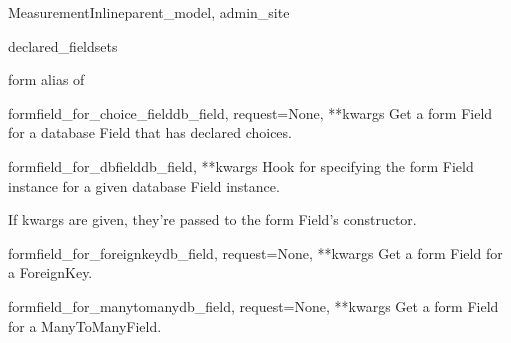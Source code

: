 \documentclass[letterpaper,10pt,english]{sphinxmanual}
\begin{document}
\hypertarget{data.admin.MeasurementInline}{}\begin{classdesc}{MeasurementInline}{parent\_model, admin\_site}~

\hypertarget{data.admin.MeasurementInline.declared_fieldsets}{}\begin{memberdesc}{declared\_fieldsets}\end{memberdesc}

\hypertarget{data.admin.MeasurementInline.form}{}\begin{memberdesc}{form}
alias of 
\end{memberdesc}

\hypertarget{data.admin.MeasurementInline.formfield_for_choice_field}{}\begin{methoddesc}{formfield\_for\_choice\_field}{db\_field, request=None, **kwargs}
Get a form Field for a database Field that has declared choices.
\end{methoddesc}

\hypertarget{data.admin.MeasurementInline.formfield_for_dbfield}{}\begin{methoddesc}{formfield\_for\_dbfield}{db\_field, **kwargs}
Hook for specifying the form Field instance for a given database Field
instance.

If kwargs are given, they're passed to the form Field's constructor.
\end{methoddesc}

\hypertarget{data.admin.MeasurementInline.formfield_for_foreignkey}{}\begin{methoddesc}{formfield\_for\_foreignkey}{db\_field, request=None, **kwargs}
Get a form Field for a ForeignKey.
\end{methoddesc}

\hypertarget{data.admin.MeasurementInline.formfield_for_manytomany}{}\begin{methoddesc}{formfield\_for\_manytomany}{db\_field, request=None, **kwargs}
Get a form Field for a ManyToManyField.
\end{methoddesc}


\end{classdesc}
\end{document}
